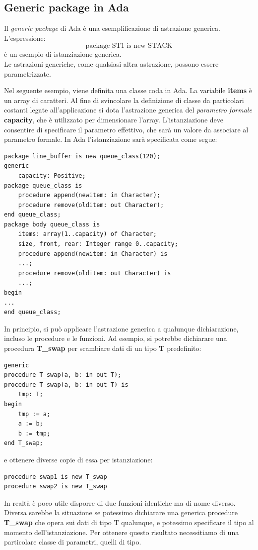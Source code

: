 \documentclass[12pt]{report}
\begin{document}
\subsection{Generic package in Ada}
Il \textit{generic package} di Ada è una esemplificazione di astrazione generica. L'espressione:
\[
\text{package ST1 is new STACK}
\]
è un esempio di istanziazione generica. \\
Le astrazioni generiche, come qualsiasi altra astrazione, possono essere parametrizzate.
\begin{example}{}{}
	Nel seguente esempio, viene definita una classe coda in Ada. La variabile \textbf{items} è un array di caratteri. Al fine di svincolare la definizione di classe da particolari costanti legate all'applicazione si dota l'astrazione generica del \textit{parametro formale} \textbf{capacity}, che è utilizzato per dimensionare l'array.  L'istanziazione deve consentire di specificare il parametro effettivo, che sarà un valore da associare al parametro formale. In Ada l'istanziazione sarà specificata come segue:
\begin{lstlisting}[style=adastyle]
package line_buffer is new queue_class(120);
generic
	capacity: Positive;
package queue_class is
	procedure append(newitem: in Character);
	procedure remove(olditem: out Character);
end queue_class;
package body queue_class is
	items: array(1..capacity) of Character;
	size, front, rear: Integer range 0..capacity;
	procedure append(newitem: in Character) is
	...;
	procedure remove(olditem: out Character) is
	...;
begin
...
end queue_class;\end{lstlisting}
\end{example}
In principio, si può applicare l'astrazione generica a qualunque dichiarazione, incluso le procedure e le funzioni. Ad esempio, si potrebbe dichiarare una procedura \textbf{T\_swap} per scambiare dati di un tipo \textbf{T} predefinito:
\begin{lstlisting}[style=adastyle]
generic
procedure T_swap(a, b: in out T);
procedure T_swap(a, b: in out T) is
	tmp: T;
begin
	tmp := a;
	a := b;
	b := tmp;
end T_swap;\end{lstlisting}
e  ottenere diverse copie di essa per istanziazione:
\begin{lstlisting}[style=adastyle]
procedure swap1 is new T_swap
procedure swap2 is new T_swap\end{lstlisting}
In realtà è poco utile disporre di due funzioni identiche ma di nome diverso. Diversa sarebbe la situazione se potessimo dichiarare una generica procedure \textbf{T\_swap} che opera sui dati di tipo T qualunque, e potessimo specificare il tipo al momento dell'istanziazione. Per ottenere questo risultato necessitiamo di una particolare classe di parametri, quelli di tipo.
\end{document}
